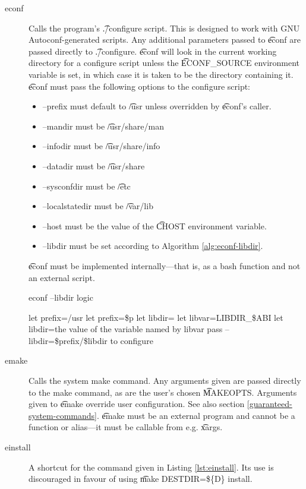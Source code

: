 \begin{description}
\item[econf] Calls the program's \t{./configure} script. This is designed to work with GNU
    Autoconf-generated scripts. Any additional parameters passed to \t{econf} are passed directly
    to \t{./configure}. \t{econf} will look in the current working directory for a configure script
    unless the \t{ECONF\_SOURCE} environment variable is set, in which case it is taken to be the
    directory containing it. \t{econf} must pass the following options to the configure script:
    \begin{itemize}
    \item --prefix must default to \t{/usr} unless overridden by \t{econf}'s caller.
    \item --mandir must be \t{/usr/share/man}
    \item --infodir must be \t{/usr/share/info}
    \item --datadir must be \t{/usr/share}
    \item --sysconfdir must be \t{/etc}
    \item --localstatedir must be \t{/var/lib}
    \item --host must be the value of the \t{CHOST} environment variable.
    \item --libdir must be set according to Algorithm \ref{alg:econf-libdir}.
    \end{itemize}

    \t{econf} must be implemented internally---that is, as a bash function and not an external
    script.

\begin{algorithm}
\caption{econf --libdir logic} \label{alg:econf-libdir}
\begin{algorithmic}[1]
\STATE let prefix=/usr
    \STATE let prefix=\$p
\ENDIF
\STATE let libdir=
    \STATE let libvar=LIBDIR\_\$ABI
        \STATE let libdir=the value of the variable named by libvar
    \ENDIF
\ENDIF
{}
    \STATE pass --libdir=\$prefix/\$libdir to configure
\ENDIF
\end{algorithmic}
\end{algorithm}

\item[emake] Calls the system make command. Any arguments given are passed directly to the make
    command, as are the user's chosen \t{MAKEOPTS}. Arguments given to \t{emake} override user
    configuration. See also section \ref{guaranteed-system-commands}. \t{emake} must be an external
    program and cannot be a function or alias---it must be callable from e.g. \t{xargs}.
\item[einstall] A shortcut for the command given in Listing \ref{lst:einstall}. Its use is
    discouraged in favour of using \t{make DESTDIR=\$\{D\} install}.


\end{description}
